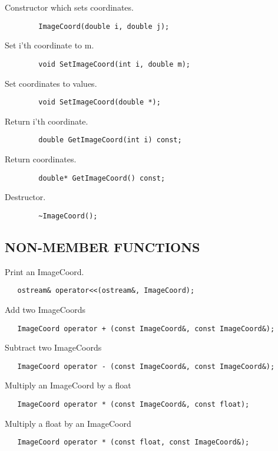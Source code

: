         Constructor which sets coordinates.
\begin{verbatim}
        ImageCoord(double i, double j);
\end{verbatim}

        Set i'th coordinate to m.
\begin{verbatim}
        void SetImageCoord(int i, double m);
\end{verbatim}

        Set coordinates to values.
\begin{verbatim}
        void SetImageCoord(double *);
\end{verbatim}

        Return i'th coordinate.
\begin{verbatim}
        double GetImageCoord(int i) const;
\end{verbatim}

        Return coordinates.
\begin{verbatim}
        double* GetImageCoord() const;
\end{verbatim}

        Destructor.
\begin{verbatim}
        ~ImageCoord();
\end{verbatim}

\subsection*{NON-MEMBER FUNCTIONS}
 Print an ImageCoord.
\begin{verbatim}
   ostream& operator<<(ostream&, ImageCoord);
\end{verbatim}

 Add two ImageCoords
\begin{verbatim}
   ImageCoord operator + (const ImageCoord&, const ImageCoord&);
\end{verbatim}

 Subtract two ImageCoords
\begin{verbatim}
   ImageCoord operator - (const ImageCoord&, const ImageCoord&);
\end{verbatim}

 Multiply an ImageCoord by a float
\begin{verbatim}
   ImageCoord operator * (const ImageCoord&, const float);
\end{verbatim}

 Multiply a float by an ImageCoord
\begin{verbatim}
   ImageCoord operator * (const float, const ImageCoord&);
\end{verbatim}
